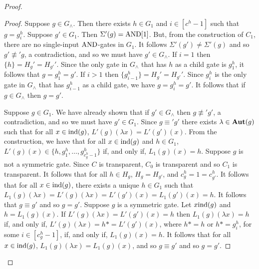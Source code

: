 \documentclass[../paper.tex]{subfiles}
\begin{document}
\begin{proof}
\begin{proof}
    
    Suppose $g \in G_{\land}$. Then there exists $h \in G_1$ and $i \in [c^h -
    1]$ such that $g = g^h_i$. Suppose $g' \in G_1$. Then $\Sigma'(g) =
    \text{\upshape AND}[1]$. But, from the construction of $C_1$, there are no single-input
    $\text{\upshape AND}$-gates in $G_1$. It follows $\Sigma'(g') \neq \Sigma'(g)$ and so $g'
    \not\equiv' g$, a contradiction, and so we must have $g' \in G_{\land}$. If
    $i = 1$ then $\{ h \} = H_g' = H_{g'}'$. Since the only gate in $G_\land$
    that has $h$ as a child gate is $g^h_1$, it follows that $g = g^h_1 = g'$.
    If $i > 1$ then $\{g^{h}_{i-1}\} = H_g' = H_{g'}'$. Since $g^h_i$ is the
    only gate in $G_\land$ that has $g^h_{i-1}$ as a child gate, we have $g =
    g^h_i = g'$. It follows that if $g \in G_\land$ then $g = g'$.

    Suppose $g \in G_1$. We have already shown that if $g' \in G_\land$ then $g
    \not\equiv' g'$, a contradiction, and so we must have $g' \in G_1$. Since $g
    \equiv' g'$ there exists $\lambda \in \text{\textbf{Aut}}(g)$ such that for all $x \in
    \text{\upshape ind}(g)$, $L'(g)(\lambda x) = L'(g')(x)$. From the construction, we have
    that for all $x \in \text{\upshape ind}(g)$ and $h \in G_1$, $L'(g)(x) \in \{h, g^h_1 ,
    \ldots, g^h_{c^h_g -1}\}$ if, and only if, $L_1(g)(x) = h$. Suppose $g$ is
    not a symmetric gate. Since $C$ is transparent, $C_0$ is transparent and so
    $C_1$ is transparent. It follows that for all $h \in H_g$, $H_g = H_{g'}$,
    and $c^h_g = 1 = c^h_{g'}$. It follows that for all $x \in \text{\upshape ind}(g)$, there
    exists a unique $h \in G_1$ such that $L_1(g)(\lambda x) = L'(g)(\lambda x)
    = L'(g')(x) = L_1 (g')(x) = h$. It follows that $g \equiv g'$ and so $g =
    g'$. Suppose $g$ is a symmetric gate. Let $x \text{\upshape ind}(g)$ and $h = L_1(g)(x)$.
    If $L'(g)(\lambda x) = L'(g')(x)= h$ then $L_1(g)(\lambda x) = h$ if, and
    only if, $L'(g)(\lambda x ) = h* = L'(g')(x)$, where $h* = h$ or $h* =
    g^{h}_i$, for some $i \in [c^h_g -1]$, if, and only if, $L_1(g) (x) = h$. It
    follows that for all $x \in \text{\upshape ind}(g)$, $L_1 (g) (\lambda x) = L_1 (g)(x)$,
    and so $g \equiv g'$ and so $g = g'$.

    


\end{proof}
\end{proof}
\end{document}
